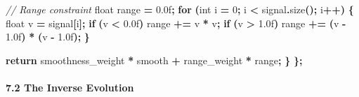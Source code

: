 \documentclass[
  11pt,
  a4paper,
]{article}
\newenvironment{Shaded}{\begin{snugshade}}{\end{snugshade}}
\newcommand{\BuiltInTok}[1]{#1}
\newcommand{\CommentTok}[1]{\textcolor[rgb]{0.56,0.35,0.01}{\textit{#1}}}
\newcommand{\ControlFlowTok}[1]{\textcolor[rgb]{0.13,0.29,0.53}{\textbf{#1}}}
\newcommand{\DataTypeTok}[1]{\textcolor[rgb]{0.13,0.29,0.53}{#1}}
\newcommand{\DecValTok}[1]{\textcolor[rgb]{0.00,0.00,0.81}{#1}}
\newcommand{\FloatTok}[1]{\textcolor[rgb]{0.00,0.00,0.81}{#1}}
\newcommand{\NormalTok}[1]{#1}
\newcommand{\OperatorTok}[1]{\textcolor[rgb]{0.81,0.36,0.00}{\textbf{#1}}}
\begin{document}
\begin{Shaded}
\begin{Highlighting}[]
        \CommentTok{// Range constraint}
        \DataTypeTok{float}\NormalTok{ range }\OperatorTok{=} \FloatTok{0.0}\BuiltInTok{f}\OperatorTok{;}
        \ControlFlowTok{for} \OperatorTok{(}\DataTypeTok{int}\NormalTok{ i }\OperatorTok{=} \DecValTok{0}\OperatorTok{;}\NormalTok{ i }\OperatorTok{\textless{}}\NormalTok{ signal}\OperatorTok{.}\NormalTok{size}\OperatorTok{();}\NormalTok{ i}\OperatorTok{++)} \OperatorTok{\{}
            \DataTypeTok{float}\NormalTok{ v }\OperatorTok{=}\NormalTok{ signal}\OperatorTok{[}\NormalTok{i}\OperatorTok{];}
            \ControlFlowTok{if} \OperatorTok{(}\NormalTok{v }\OperatorTok{\textless{}} \FloatTok{0.0}\BuiltInTok{f}\OperatorTok{)}\NormalTok{ range }\OperatorTok{+=}\NormalTok{ v }\OperatorTok{*}\NormalTok{ v}\OperatorTok{;}
            \ControlFlowTok{if} \OperatorTok{(}\NormalTok{v }\OperatorTok{\textgreater{}} \FloatTok{1.0}\BuiltInTok{f}\OperatorTok{)}\NormalTok{ range }\OperatorTok{+=} \OperatorTok{(}\NormalTok{v }\OperatorTok{{-}} \FloatTok{1.0}\BuiltInTok{f}\OperatorTok{)} \OperatorTok{*} \OperatorTok{(}\NormalTok{v }\OperatorTok{{-}} \FloatTok{1.0}\BuiltInTok{f}\OperatorTok{);}
        \OperatorTok{\}}
        
        \ControlFlowTok{return}\NormalTok{ smoothness\_weight }\OperatorTok{*}\NormalTok{ smooth }\OperatorTok{+}\NormalTok{ range\_weight }\OperatorTok{*}\NormalTok{ range}\OperatorTok{;}
    \OperatorTok{\}}
\OperatorTok{\};}
\end{Highlighting}
\end{Shaded}

\paragraph{7.2 The Inverse Evolution}\label{the-inverse-evolution}
\end{document}
